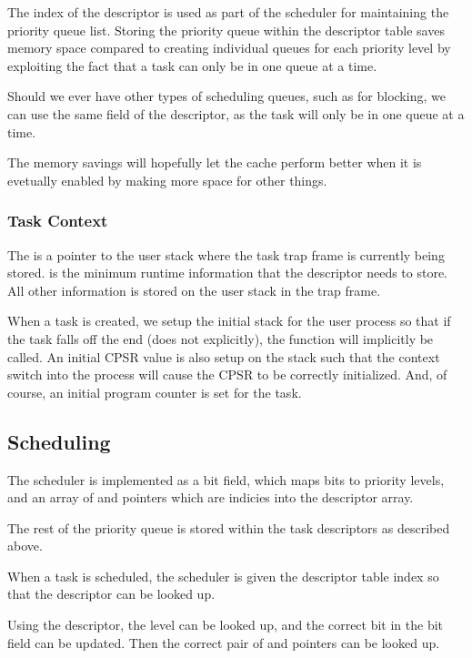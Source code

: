 \documentclass[pdftex,10pt,a4paper]{article}
\begin{document}
The  index of the descriptor is used as part of the
scheduler for maintaining the priority queue list. Storing the
priority queue within the descriptor table saves memory space
compared to creating individual queues for each priority level by
exploiting the fact that a task can only be in one queue at a time.

Should we ever have other types of scheduling queues, such as for
blocking, we can use the same  field of the descriptor, as
the task will only be in one queue at a time.

The memory savings will hopefully let the cache perform better when it
is evetually enabled by making more space for other things.

\subsubsection*{Task Context}

The  is a pointer to the user stack where the task trap frame
is currently being stored.  is the minimum runtime
information that the descriptor needs to store. All other information
is stored on the user stack in the trap frame.

When a task is created, we setup the initial stack for the user
process so that if the task falls off the end (does not 
explicitly), the  function will implicitly be called. An
initial CPSR value is also setup on the stack such that the context
switch into the process will cause the CPSR to be correctly
initialized. And, of course, an initial program counter is set for the
task.

\subsection*{Scheduling}

The scheduler is implemented as a bit field, which maps bits to
priority levels, and an array of  and  pointers
which are indicies into the descriptor array.

The rest of the priority queue is stored within the task descriptors
as described above.

When a task is scheduled, the scheduler is given the descriptor table
index so that the descriptor can be looked up.

Using the descriptor, the  level can be looked up, and
the correct bit in the bit field can be updated. Then the correct pair
of  and  pointers can be looked up.
\end{document}
